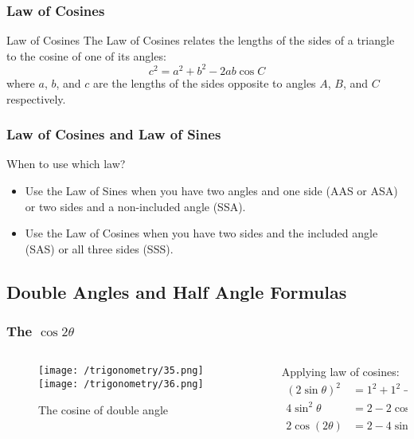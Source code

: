 \documentclass{beamer}
\begin{document}
    \begin{frame}
    \frametitle{Law of Cosines}
    \begin{block}{Law of Cosines}
        The Law of Cosines relates the lengths of the sides of a triangle to the cosine of one of its angles:
        \[
        c^2 = a^2 + b^2 - 2ab \cos C
        \]
        where \(a\), \(b\), and \(c\) are the lengths of the sides opposite to angles \(A\), \(B\), and \(C\) respectively.
    \end{block}
    \end{frame}

\begin{frame}
    \frametitle{Law of Cosines and Law of Sines}
    \begin{block}{When to use which law?}
        \begin{itemize}
            \item Use the Law of Sines when you have two angles and one side (AAS or ASA) or two sides and a non-included angle (SSA).
            \item Use the Law of Cosines when you have two sides and the included angle (SAS) or all three sides (SSS).
        \end{itemize}
    \end{block}
\end{frame}

\subsection{Double Angles and Half Angle Formulas}

\begin{frame}
    \frametitle{The \(\cos 2\theta\)}
    \begin{columns}
        \begin{column}{0.5\textwidth}
            \begin{figure}
                \centering
                \texttt{[image: /trigonometry/35.png]}
                \texttt{[image: /trigonometry/36.png]}
                \caption{The cosine of double angle}
            \end{figure}
        \end{column}
        \begin{column}{0.5\textwidth}
            Applying law of cosines:
            \begin{align}
                (2\sin \theta)^2 &= 1^2 + 1^2 - 2\cos(2\theta) \\
                4\sin^2 \theta &= 2 - 2\cos(2\theta) \\
                2\cos(2\theta) &= 2 - 4\sin^2 \theta 
            \end{align}
        \end{column}
    \end{columns}
\end{frame}
\end{document}
